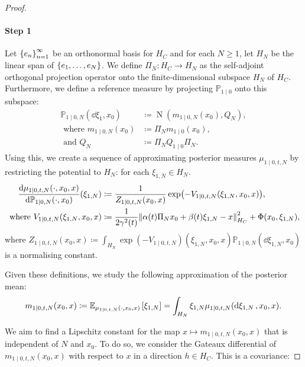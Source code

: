 \begin{proof}
  \paragraph{Step 1} Let \(\qty{e_{n}}_{n=1}^{\infty}\) be an orthonormal basis for \(H_{C}\) and for each \(N \geq 1\), let \(H_{N}\) be the linear span of \(\qty{e_{1}, \ldots, e_{N}}\). We define \(\Pi_{N} : H_{C} \to H_{N}\) as the self-adjoint orthogonal projection operator onto the finite-dimensional subspace \(H_{N}\) of \(H_{C}\). Furthermore, we define a reference measure by projecting \(\mathbb{P}_{1 \mid 0}\) onto this subspace:
  \begin{align*}
    \mathbb{P}_{1 \mid 0, N}(\dd{\xi_{1}}, x_{0}) &\coloneqq \operatorname{N}(m_{1 \mid 0, N}(x_{0}),  Q_{N}), \\
    \text{ where } m_{1 \mid 0, N}(x_{0}) &\coloneqq \Pi_{N} m_{1 \mid 0}(x_{0}), \\
    \text{ and } Q_{N} &\coloneqq \Pi_{N} Q_{1 \mid 0} \Pi _{N}.
  \end{align*}
  Using this, we create a sequence of approximating posterior measures \(\mu_{1 \mid 0, t, N}\) by restricting the potential to \(H_{N}\): for each \(\xi_{1,N} \in H_{N}\).
  \begin{align*}
    \dv{\mu_{1 \mid 0, t, N}(\cdot, x_{0}, x)}{\mathbb{P}_{1 \mid 0, N}(\cdot, x_{0})}{}(\xi_{1,N}) &\coloneqq \frac{1}{Z_{1 \mid 0, t, N}(x_{0}, x)} \exp(-V_{1 \mid 0, t, N}(\xi_{1,N}, x_{0}, x)), \\
    \text{ where } V_{1 \mid 0, t, N}(\xi_{1, N}, x_{0}, x) &\coloneqq  \frac{1}{2\gamma^{2}(t)} \norm{\alpha(t) \Pi_{N} x_{0} + \beta(t) \xi_{1, N} - x}^{2}_{H_{C}} + \Phi(x_{0}, \xi_{1, N}),
  \end{align*}
  where \(Z_{1 \mid 0, t, N}(x_{0}, x) \coloneqq \int_{H_{N}} \exp(-V_{1 \mid 0, t, N})(\xi_{1, N}, x_{0}, x) \mathbb{P}_{1 \mid 0, N}(\dd{\xi_{1, N}, x_{0}})\) is a normalising constant.

  Given these definitions, we study the following approximation of the posterior mean:
  \[
    m_{1 \mid 0, t, N}(x_{0}, x) \coloneqq \mathop{\mathbb{E}_{\mu_{1 \mid 0, t, N}(\cdot, x_{0}, x)}}\qty[\xi_{1, N}] = \int_{H_{N}} \xi_{1, N}\mu_{1 \mid 0, t, N}(\dd{\xi_{1, N}}, x_{0}, x).
  \]

  We aim to find a Lipschitz constant for the map \(x \mapsto m_{1 \mid 0, t, N}(x_{0}, x)\) that is independent of \(N\) and \(x_{0}\). To do so, we consider the Gateaux differential of \(m_{1 \mid 0, t, N}(x_{0}, x)\) with respect to \(x\) in a direction \(h \in H_{C}\). This is a covariance:


\end{proof}
